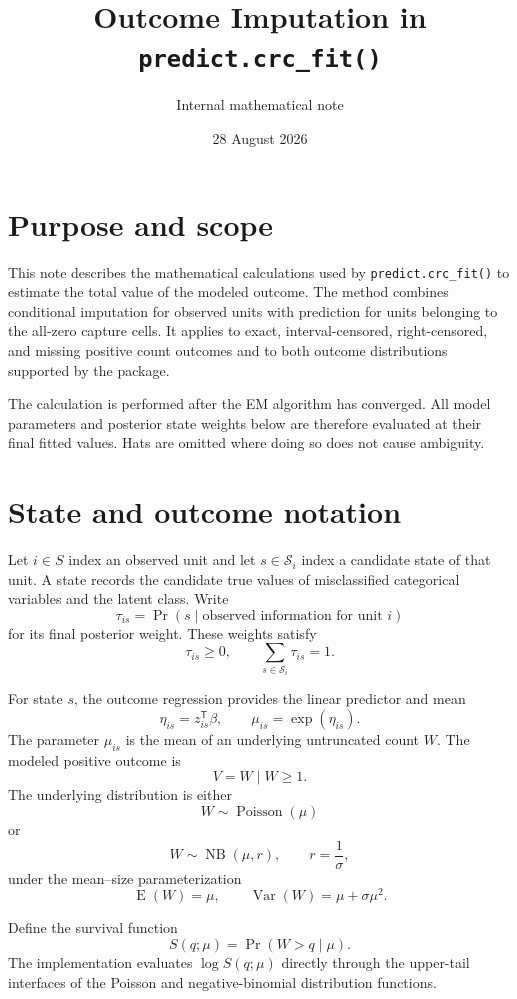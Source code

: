 \documentclass[11pt,a4paper]{article}
\title{Outcome Imputation in \texttt{predict.crc\_fit()}}
\author{Internal mathematical note}
\date{28 August 2026}
\begin{document}
\maketitle

\section{Purpose and scope}

This note describes the mathematical calculations used by
\texttt{predict.crc\_fit()} to estimate the total value of the modeled outcome.
The method combines conditional imputation for observed units with prediction
for units belonging to the all-zero capture cells. It applies to exact,
interval-censored, right-censored, and missing positive count outcomes and to
both outcome distributions supported by the package.

The calculation is performed after the EM algorithm has converged. All model
parameters and posterior state weights below are therefore evaluated at their
final fitted values. Hats are omitted where doing so does not cause ambiguity.

\section{State and outcome notation}

Let $i\in S$ index an observed unit and let $s\in\mathcal S_i$ index a
candidate state of that unit. A state records the candidate true values of
misclassified categorical variables and the latent class. Write
\[
  \tau_{is}
  =\Pr(s\mid\text{observed information for unit }i)
\]
for its final posterior weight. These weights satisfy
\[
  \tau_{is}\geq0,
  \qquad
  \sum_{s\in\mathcal S_i}\tau_{is}=1.
\]

For state $s$, the outcome regression provides the linear predictor and mean
\[
  \eta_{is}=z_{is}^{\mathsf T}\beta,
  \qquad
  \mu_{is}=\exp(\eta_{is}).
\]
The parameter $\mu_{is}$ is the mean of an underlying untruncated count $W$.
The modeled positive outcome is
\[
  V=W\mid W\geq1.
\]
The underlying distribution is either
\[
  W\sim\operatorname{Poisson}(\mu)
\]
or
\[
  W\sim\operatorname{NB}(\mu,r),
  \qquad r=\frac{1}{\sigma},
\]
under the mean--size parameterization
\[
  \operatorname{E}(W)=\mu,
  \qquad
  \operatorname{Var}(W)=\mu+\sigma\mu^2.
\]

Define the survival function
\[
  S(q;\mu)=\Pr(W>q\mid\mu).
\]
The implementation evaluates $\log S(q;\mu)$ directly through the upper-tail
interfaces of the Poisson and negative-binomial distribution functions.
\end{document}
